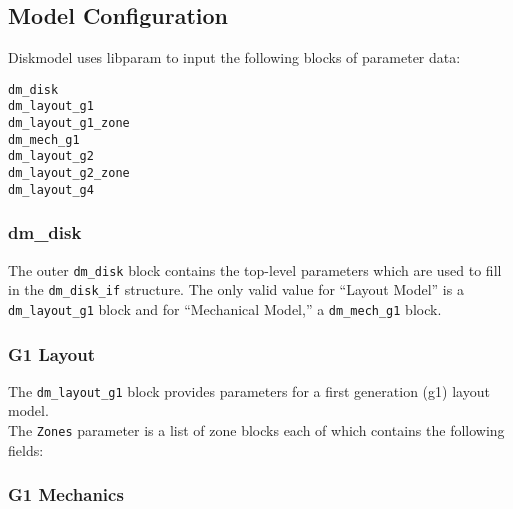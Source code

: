 
\subsection{Model Configuration}
Diskmodel uses libparam to input the following blocks of parameter data:

\begin{verbatim}
dm_disk
dm_layout_g1
dm_layout_g1_zone
dm_mech_g1
dm_layout_g2
dm_layout_g2_zone
dm_layout_g4
\end{verbatim}

\subsubsection{dm\_disk}

The outer \texttt{dm\_disk} block contains the top-level parameters
which are used to fill in the \texttt{dm\_disk\_if} structure.  The
only valid value for ``Layout Model'' is a \texttt{dm\_layout\_g1}
block and for ``Mechanical Model,'' a \texttt{dm\_mech\_g1} block.\\




%

\subsubsection{G1 Layout}

The \texttt{dm\_layout\_g1} block provides parameters for a first
generation (g1) layout model.\\



The \texttt{Zones} parameter is a list of zone blocks each of which
contains the following fields:\\



\subsubsection{G1 Mechanics}

